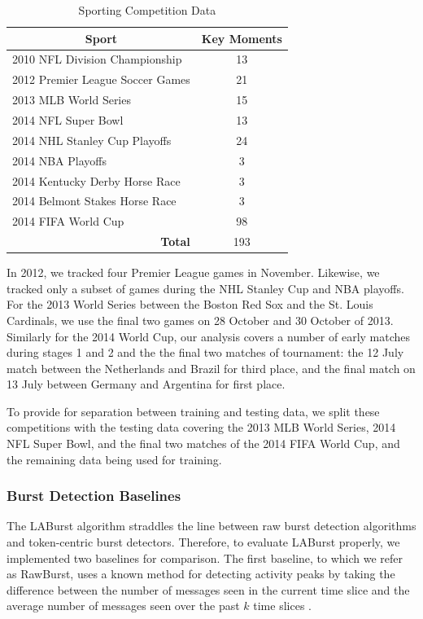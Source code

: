 \documentclass[letterpaper]{article}
\begin{document}
\begin{table}[htdp]
\footnotesize
\caption{Sporting Competition Data}
\begin{center}
\begin{tabular}{|p{2in}|c|}
\hline
\multicolumn{1}{|c|}{\textbf{Sport}} & \textbf{Key Moments} \\ \hline
2010 NFL Division Championship & 13 \\ \hline
2012 Premier League Soccer Games & 21 \\ \hline
2013 MLB World Series  & 15 \\ \hline
2014 NFL Super Bowl & 13 \\ \hline
2014 NHL Stanley Cup Playoffs & 24 \\ \hline
2014 NBA Playoffs & 3 \\ \hline
2014 Kentucky Derby Horse Race & 3 \\ \hline
2014 Belmont Stakes Horse Race & 3 \\ \hline
2014 FIFA World Cup & 98 \\ \hline
\multicolumn{1}{|r|}{\textbf{Total}} & 193 \\ \hline
\end{tabular}
\end{center}
\label{tab:eventStats}
\end{table}

In 2012, we tracked four Premier League games in November.
Likewise, we tracked only a subset of games during the NHL Stanley Cup and NBA playoffs.
For the 2013 World Series between the Boston Red Sox and the St. Louis Cardinals, we use the final two games on 28 October and 30 October of 2013.
Similarly for the 2014 World Cup, our analysis covers a number of early matches during stages 1 and 2 and the the final two matches of tournament: the 12 July match between the Netherlands and Brazil for third place, and the final match on 13 July between Germany and Argentina for first place.

To provide for separation between training and testing data, we split these competitions with the testing data covering the 2013 MLB World Series, 2014 NFL Super Bowl, and the final two matches of the 2014 FIFA World Cup, and the remaining data being used for training.

\subsubsection{Burst Detection Baselines}

The LABurst algorithm straddles the line between raw burst detection algorithms and token-centric burst detectors.
Therefore, to evaluate LABurst properly, we implemented two baselines for comparison.
The first baseline, to which we refer as RawBurst, uses a known method for detecting activity peaks by taking the difference between the number of messages seen in the current time slice and the average number of messages seen over the past $k$ time slices \cite{vasudevan2013twitter,Lehmann:2012:DCC:2187836.2187871}.
\end{document}
